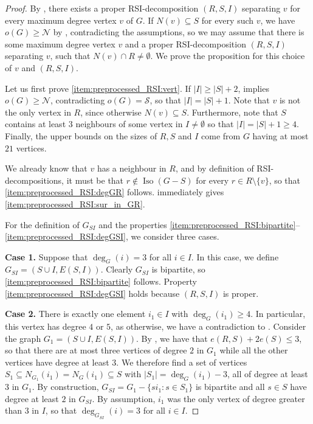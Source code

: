 \documentclass[a4paper,11pt,oneside]{scrartcl}
\theoremstyle{definition}
\theoremstyle{remark}
\DeclareMathOperator{\Iso}{Iso}
\begin{document}
\begin{proof}
    By , there exists a proper RSI-decomposition $(R,S,I)$ separating $v$ for every maximum degree vertex $v$ of $G$. If $N(v) \subseteq S$ for every such $v$, we have $o(G) \geq \mathcal N$ by , contradicting the assumptions, so we may assume that there is some maximum degree vertex $v$ and a proper RSI-decomposition $(R,S,I)$ separating $v$, such that $N(v) \cap R \neq \emptyset$. We prove the proposition for this choice of $v$ and $(R,S,I)$. 

    Let us first prove \ref{item:preprocessed_RSI:vert}. If $|I| \geq |S| + 2$,  implies $o(G) \geq \mathcal  N$, contradicting $o(G) = \mathcal S$, so that $|I| = |S|+1$. Note that $v$ is not the only vertex in $R$, since otherwise $N(v) \subseteq S$. Furthermore, note that $S$ contains at least $3$ neighbours of some vertex in $I \neq \emptyset$ so that $|I| = |S|+1 \geq 4$. Finally, the upper bounds on the sizes of $R,S$ and $I$ come from $G$ having at most $21$ vertices. 
    
    We already know that $v$ has a neighbour in $R$, and by definition of RSI-decompositions, it must be that $r \notin \Iso(G-S)$ for every $r \in R \setminus \{v\}$, so that \ref{item:preprocessed_RSI:degGR} follows.  immediately gives \ref{item:preprocessed_RSI:sur_in_GR}.

    For the definition of $G_{SI}$ and the properties \ref{item:preprocessed_RSI:bipartite}--\ref{item:preprocessed_RSI:degGSI}, we consider three cases.

    \textbf{Case 1.} Suppose that $\deg_G(i) = 3$ for all $i \in I$. In this case, we define $G_{SI} = (S \cup I, E(S,I))$. Clearly $G_{SI}$ is bipartite, so \ref{item:preprocessed_RSI:bipartite} follows. Property \ref{item:preprocessed_RSI:degGSI} holds because $(R,S,I)$ is proper.
    
    \textbf{Case 2.} There is exactly one element $i_1 \in I$ with $\deg_G(i_1) \geq 4$. In particular, this vertex has degree $4$ or $5$, as otherwise, we have a contradiction to . Consider the graph $G_1 = (S \cup I, E(S,I))$. By , we have that $e(R,S)+2e(S) \leq 3$, so that there are at most three vertices of degree $2$ in $G_1$ while all the other vertices have degree at least $3$. We therefore find a set of vertices $S_1 \subseteq N_{G_1}(i_1) = N_{G}(i_1) \subseteq S$ with $|S_1| = \deg_G(i_1)-3$, all of degree at least $3$ in $G_1$. By construction, $G_{SI} = G_1 - \{si_1:s\in S_1\}$ is bipartite and all $s\in S$ have degree at least $2$ in $G_{SI}$. By assumption, $i_1$ was the only vertex of degree greater than $3$ in $I$, so that $\deg_{G_{SI}}(i) = 3$ for all $i\in I$. 
    

\end{proof}
\end{document}
